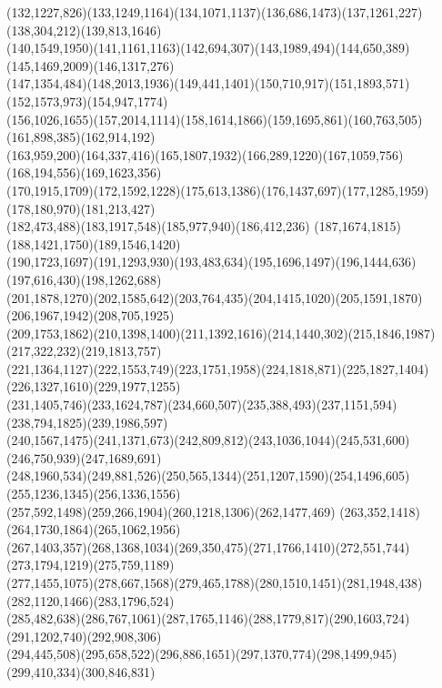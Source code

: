\documentclass[a4paper,twopage,reqno,12pt]{amsart}
\theoremstyle{definition}
\numberwithin{equation}{section}
\begin{document}
\begin{enumerate}
{{(132,1227,826)(133,1249,1164)(134,1071,1137)(136,686,1473)(137,1261,227)(138,304,212)(139,813,1646)\\
(140,1549,1950)(141,1161,1163)(142,694,307)(143,1989,494)(144,650,389)(145,1469,2009)(146,1317,276)\\
(147,1354,484)(148,2013,1936)(149,441,1401)(150,710,917)(151,1893,571)(152,1573,973)(154,947,1774)\\
(156,1026,1655)(157,2014,1114)(158,1614,1866)(159,1695,861)(160,763,505)(161,898,385)(162,914,192)\\
(163,959,200)(164,337,416)(165,1807,1932)(166,289,1220)(167,1059,756)(168,194,556)(169,1623,356)\\
(170,1915,1709)(172,1592,1228)(175,613,1386)(176,1437,697)(177,1285,1959)(178,180,970)(181,213,427)\\
(182,473,488)(183,1917,548)(185,977,940)(186,412,236)
(187,1674,1815)(188,1421,1750)(189,1546,1420)\\(190,1723,1697)(191,1293,930)(193,483,634)(195,1696,1497)(196,1444,636)(197,616,430)(198,1262,688)\\
(201,1878,1270)(202,1585,642)(203,764,435)(204,1415,1020)(205,1591,1870)(206,1967,1942)(208,705,1925)\\
(209,1753,1862)(210,1398,1400)(211,1392,1616)(214,1440,302)(215,1846,1987)(217,322,232)(219,1813,757)\\
(221,1364,1127)(222,1553,749)(223,1751,1958)(224,1818,871)(225,1827,1404)(226,1327,1610)(229,1977,1255)\\
(231,1405,746)(233,1624,787)(234,660,507)(235,388,493)(237,1151,594)(238,794,1825)(239,1986,597)\\
(240,1567,1475)(241,1371,673)(242,809,812)(243,1036,1044)(245,531,600)(246,750,939)(247,1689,691)\\
(248,1960,534)(249,881,526)(250,565,1344)(251,1207,1590)(254,1496,605)(255,1236,1345)(256,1336,1556)\\
(257,592,1498)(259,266,1904)(260,1218,1306)(262,1477,469)
(263,352,1418)(264,1730,1864)(265,1062,1956)\\
(267,1403,357)(268,1368,1034)(269,350,475)(271,1766,1410)(272,551,744)(273,1794,1219)(275,759,1189)\\
(277,1455,1075)(278,667,1568)(279,465,1788)(280,1510,1451)(281,1948,438)(282,1120,1466)(283,1796,524)\\
(285,482,638)(286,767,1061)(287,1765,1146)(288,1779,817)(290,1603,724)(291,1202,740)(292,908,306)\\
(294,445,508)(295,658,522)(296,886,1651)(297,1370,774)(298,1499,945)(299,410,334)(300,846,831)\\
}}
\end{enumerate}
\end{document}
